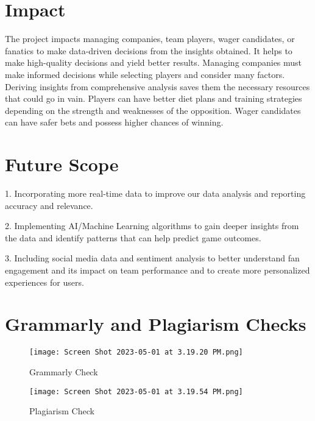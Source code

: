 \documentclass[lettersize]{IEEEtran}
\begin{document}
\section{\textbf{Impact}}
\vspace{-0.7\baselineskip}
The project impacts managing companies, team players, wager candidates, or fanatics to make data-driven decisions from the insights obtained. It helps to make high-quality decisions and yield better results. Managing companies must make informed decisions while selecting players and consider many factors. Deriving insights from comprehensive analysis saves them the necessary resources that could go in vain. Players can have better diet plans and training strategies depending on the strength and weaknesses of the opposition. Wager candidates can have safer bets and possess higher chances of winning.

\section{\textbf{Future Scope}}
\vspace{-0.6\baselineskip}
1. Incorporating more real-time data to improve our data analysis and reporting accuracy and relevance.

2. Implementing AI/Machine Learning algorithms to gain deeper insights from the data and identify patterns that can help predict game outcomes.

3. Including social media data and sentiment analysis to better understand fan engagement and its impact on team performance and to create more personalized experiences for users.

\section{\textbf{Grammarly and Plagiarism Checks}}
\vspace{-0.5\baselineskip}
\begin{figure}[H]
    \centering
    \texttt{[image: Screen Shot 2023-05-01 at 3.19.20 PM.png]}
    \caption{Grammarly Check}
    \label{fig:image_label}
\end{figure}

\begin{figure}[H]
    \centering
    \texttt{[image: Screen Shot 2023-05-01 at 3.19.54 PM.png]}
    \caption{Plagiarism Check}
    \label{fig:image_label}
\end{figure}
\end{document}
